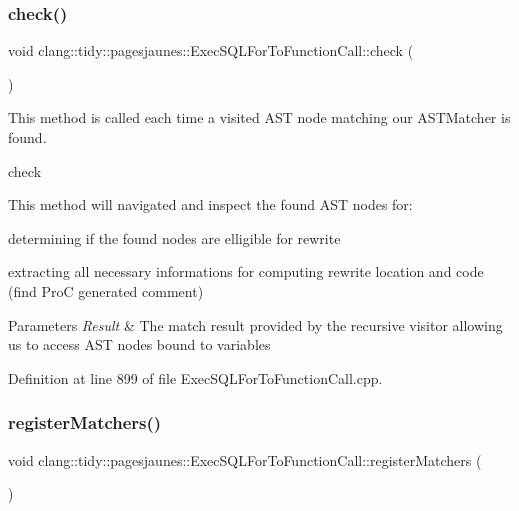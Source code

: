 \subsubsection{\texorpdfstring{check()}{check()}}
{\footnotesize\ttfamily void clang\+::tidy\+::pagesjaunes\+::\+Exec\+S\+Q\+L\+For\+To\+Function\+Call\+::check (\begin{DoxyParamCaption}\item[{const ast\+\_\+matchers\+::\+Match\+Finder\+::\+Match\+Result \&}]{ }\end{DoxyParamCaption})\hspace{0.3cm}{\ttfamily [override]}}



This method is called each time a visited A\+ST node matching our A\+S\+T\+Matcher is found. 

check

This method will navigated and inspect the found A\+ST nodes for\+:
\begin{DoxyItemize}
\item determining if the found nodes are elligible for rewrite
\item extracting all necessary informations for computing rewrite location and code (find ProC generated comment)
\end{DoxyItemize}


\begin{DoxyParams}{Parameters}
{\em Result} & The match result provided by the recursive visitor allowing us to access A\+ST nodes bound to variables \\
\hline
\end{DoxyParams}


Definition at line 899 of file Exec\+S\+Q\+L\+For\+To\+Function\+Call.\+cpp.

\mbox{\label{classclang_1_1tidy_1_1pagesjaunes_1_1_exec_s_q_l_for_to_function_call_ab18c38a24c7fbe5ce1f50804414ce079}} 
\subsubsection{\texorpdfstring{register\+Matchers()}{registerMatchers()}}
{\footnotesize\ttfamily void clang\+::tidy\+::pagesjaunes\+::\+Exec\+S\+Q\+L\+For\+To\+Function\+Call\+::register\+Matchers (\begin{DoxyParamCaption}\item[{ast\+\_\+matchers\+::\+Match\+Finder $\ast$}]{ }\end{DoxyParamCaption})\hspace{0.3cm}{\ttfamily [override]}}



